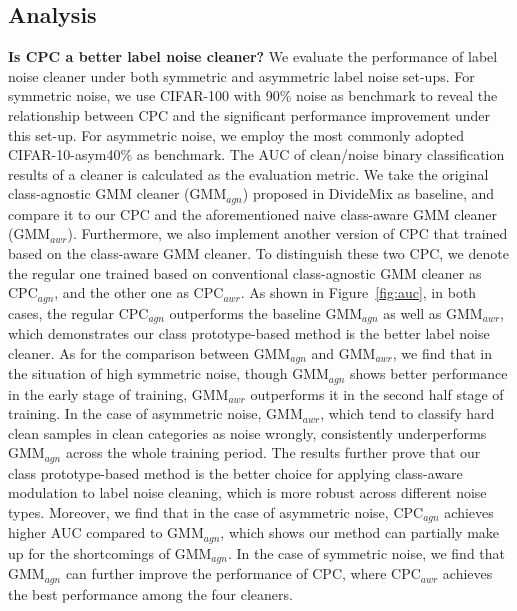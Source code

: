 \documentclass{article} \usepackage{iclr2023_conference,times}
\begin{document}
\subsection{Analysis}
\textbf{Is CPC a better label noise cleaner?} We evaluate the performance of label noise cleaner under both symmetric and asymmetric label noise set-ups. For symmetric noise, we use CIFAR-100 with 90\% noise as benchmark to reveal the relationship between CPC and the significant performance improvement under this set-up. For asymmetric noise, we employ the most commonly adopted CIFAR-10-asym40\% as benchmark. The AUC of clean/noise binary classification results of a cleaner is calculated as the evaluation metric. We take the original class-agnostic GMM cleaner (GMM$_{agn}$) proposed in DivideMix as baseline, and compare it to our CPC and the aforementioned naive class-aware GMM cleaner (GMM$_{awr}$). Furthermore, we also implement another version of CPC that trained based on the class-aware GMM cleaner. To distinguish these two CPC, we denote the regular one trained based on conventional class-agnostic GMM cleaner as CPC$_{agn}$, and the other one as CPC$_{awr}$. As shown in Figure~\ref{fig:auc}, in both cases, the regular CPC$_{agn}$ outperforms the baseline GMM$_{agn}$ as well as GMM$_{awr}$, which demonstrates our class prototype-based method is the better label noise cleaner. As for the comparison between GMM$_{agn}$ and GMM$_{awr}$, we find that in the situation of high symmetric noise, though GMM$_{agn}$ shows better performance in the early stage of training, GMM$_{awr}$ outperforms it in the second half stage of training. In the case of asymmetric noise, GMM$_{awr}$, which tend to classify hard clean samples in clean categories as noise wrongly, consistently underperforms GMM$_{agn}$ across the whole training period. The results further prove that our class prototype-based method is the better choice for applying class-aware modulation to label noise cleaning, which is more robust across different noise types. Moreover, we find that in the case of asymmetric noise, CPC$_{agn}$ achieves higher AUC compared to GMM$_{agn}$, which shows our method can partially make up for the shortcomings of GMM$_{agn}$. In the case of symmetric noise, we find that GMM$_{agn}$ can further improve the performance of CPC, where CPC$_{awr}$ achieves the best performance among the four cleaners.
\end{document}
